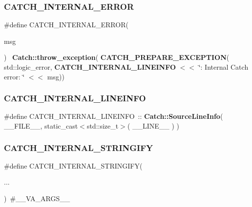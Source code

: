 \mbox{\label{catch_8hpp_a05b6c8a530fa2e5b397add8966522777}} 
\subsubsection{CATCH\_INTERNAL\_ERROR}
{\footnotesize\ttfamily \#define C\+A\+T\+C\+H\+\_\+\+I\+N\+T\+E\+R\+N\+A\+L\+\_\+\+E\+R\+R\+OR(\begin{DoxyParamCaption}\item[{}]{msg }\end{DoxyParamCaption})~\textbf{ Catch\+::throw\+\_\+exception}(\textbf{ C\+A\+T\+C\+H\+\_\+\+P\+R\+E\+P\+A\+R\+E\+\_\+\+E\+X\+C\+E\+P\+T\+I\+ON}( std\+::logic\+\_\+error, \textbf{ C\+A\+T\+C\+H\+\_\+\+I\+N\+T\+E\+R\+N\+A\+L\+\_\+\+L\+I\+N\+E\+I\+N\+FO} $<$$<$ \char`\"{}\+: Internal Catch error\+: \char`\"{} $<$$<$ msg))}

\mbox{\label{catch_8hpp_abc0b2405454c51748a31e0393d9ad5d1}} 
\subsubsection{CATCH\_INTERNAL\_LINEINFO}
{\footnotesize\ttfamily \#define C\+A\+T\+C\+H\+\_\+\+I\+N\+T\+E\+R\+N\+A\+L\+\_\+\+L\+I\+N\+E\+I\+N\+FO~\+::\textbf{ Catch\+::\+Source\+Line\+Info}( \+\_\+\+\_\+\+F\+I\+L\+E\+\_\+\+\_\+, static\+\_\+cast$<$std\+::size\+\_\+t$>$( \+\_\+\+\_\+\+L\+I\+N\+E\+\_\+\+\_\+ ) )}

\mbox{\label{catch_8hpp_ab6dc42a98c8854e2e1d91874b1fe406c}} 
\subsubsection{CATCH\_INTERNAL\_STRINGIFY}
{\footnotesize\ttfamily \#define C\+A\+T\+C\+H\+\_\+\+I\+N\+T\+E\+R\+N\+A\+L\+\_\+\+S\+T\+R\+I\+N\+G\+I\+FY(\begin{DoxyParamCaption}\item[{}]{... }\end{DoxyParamCaption})~\#\+\_\+\+\_\+\+V\+A\+\_\+\+A\+R\+G\+S\+\_\+\+\_\+}

